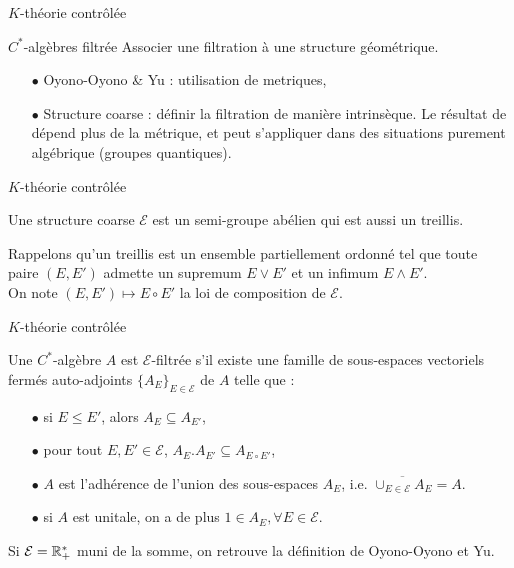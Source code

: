 \begin{frame}{$K$-théorie contrôlée}
\begin{block}{$C^*$-algèbres filtrée} 
Associer une filtration à une structure géométrique. 
\end{block}
\vspace{0.3 cm}
\begin{itemize}
\item[$\bullet$] Oyono-Oyono \& Yu : utilisation de metriques,
\vspace{0.3 cm}
\item[$\bullet$] Structure coarse : définir la filtration de manière intrinsèque. Le résultat de dépend plus de la métrique, et peut s'appliquer dans des situations purement algébrique (groupes quantiques).
\end{itemize}
\end{frame}

\begin{frame}{$K$-théorie contrôlée}
\begin{definitionfr}
Une structure coarse $\mathcal E$ est un semi-groupe abélien qui est aussi un treillis. \\
\end{definitionfr}
\vspace{0.3 cm}
Rappelons qu'un treillis est un ensemble partiellement ordonné tel que toute paire $(E,E')$ admette un supremum $E\vee E'$ et un infimum $E\wedge E'$.\\
\vspace{0.3 cm}
On note $(E,E')\mapsto E\circ E'$ la loi de composition de $\mathcal E$.
\end{frame}

\begin{frame}{$K$-théorie contrôlée}
\begin{definitionfr}
Une $C^*$-algèbre $A$ est $\mathcal E$-filtrée s'il existe une famille de sous-espaces vectoriels fermés auto-adjoints $\{A_E\}_{E\in\mathcal E}$ de $A$ telle que :
\begin{itemize}
\item[$\bullet$] si $E\leq E'$, alors $A_E\subseteq A_{E'}$,
\item[$\bullet$] pour tout $E,E'\in\mathcal E$, $A_E.A_{E'}\subseteq A_{E\circ E'}$,
\item[$\bullet$] $A$ est l'adhérence de l'union des sous-espaces $A_E$, i.e. $\overline{\cup_{E\in\mathcal E}A_E} = A$.
\item[$\bullet$] si $A$ est unitale, on a de plus $1\in A_E,\forall E\in\mathcal E$.
\end{itemize}
\end{definitionfr}

Si $\mathcal E = \mathbb R_+^*$ muni de la somme, on retrouve la définition de Oyono-Oyono et Yu. 
\end{frame}

